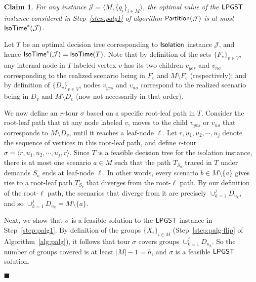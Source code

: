 \documentclass[11pt]{article}
\newtheorem{claim}[thm]{Claim}
\def\js{\ensuremath{\mathcal{J}}}
\def\palg{\ensuremath{{\sf Partition}}\xspace}
\def\isoprob{\ensuremath{{\sf Isolation}}\xspace}
\def\isotime{\ensuremath{{\sf IsoTime}}}
\def\isoopt{{\isotime}^*}
\def\lpgst{\ensuremath{{\sf LPGST}}\xspace}
\newenvironment{pf}{

\noindent{\bf Proof:}} {\hfill$\blacksquare$


}
\begin{document}
\begin{claim}\label{cl:alg1}
  For any instance $\js = \langle M, \{q_i\}_{i\in M}\rangle$, the
  optimal value of the \lpgst instance considered in
  Step~\ref{step:palg1} of algorithm $\palg(\js)$ is at most
  $\isoopt(\js)$.
   \end{claim}
\begin{pf}
  Let $T$ be an optimal decision tree corresponding to  \isoprob
  instance $\js$, and hence $\isoopt(\js) = \isotime(T)$. Note that by
  definition of the sets $\{F_v\}_{v\in V}$, any internal node in
  $T$ labeled vertex $v$ has its two children $v_{yes}$ and $v_{no}$
  corresponding to the realized scenario being in $F_v$ and $M
  \setminus F_v$ (respectively); and by
  definition of $\{D_v\}_{v\in V}$, nodes $v_{yes}$ and $v_{no}$
  correspond  to the realized scenario being in $D_v$ and $M\setminus
  D_v$ (now not necessarily in that order).

We now define an $r$-tour $\sigma$ based on a specific root-leaf path in $T$.   Consider the root-leaf path that at any 
node labeled $v$, moves  to the child $v_{yes}$ or $v_{no}$ that corresponds to
  $M\setminus D_v$, until it reaches a leaf-node $\ell$. Let $r, u_1, u_2, \cdots,
  u_{j}$ denote the sequence of vertices in this root-leaf path, and define $r$-tour   
   $\sigma=\langle r, u_1, u_2, \cdots,
  u_{j}, r\rangle$.  
  Since $T$ is a feasible decision tree for the isolation
  instance,  there is at most one scenario $a\in M$ such that the path $T_{S_a}$ traced in $T$ under demands $S_a$ ends at leaf-node $\ell$. In other words,  every scenario $b\in M\setminus \{a\}$ gives rise to a
  root-leaf path $T_{S_b}$ that diverges from the root-$\ell$ path.  By our definition of the root-$\ell$ path,  the scenarios that diverge  from it are precisely $\cup_{k=1}^{j} D_{u_k}$, and so 
  $\cup_{k=1}^{j} D_{u_k} = M\setminus \{a\}$.
  
  Next, we show that $\sigma$ is a feasible  solution to the
  \lpgst instance in Step~\ref{step:palg1}. By definition of the groups $\{X_i\}_{i\in M}$ (Step~\ref{step:palg-flip} of Algorithm~\ref{alg:palg}), it follows that tour $\sigma$ covers  groups $\cup_{k=1}^{j} D_{u_k}$. So the number of groups covered is at least $|M|-1=h$, and $\sigma$ is a feasible \lpgst solution. 
  

\end{pf}
\end{document}

